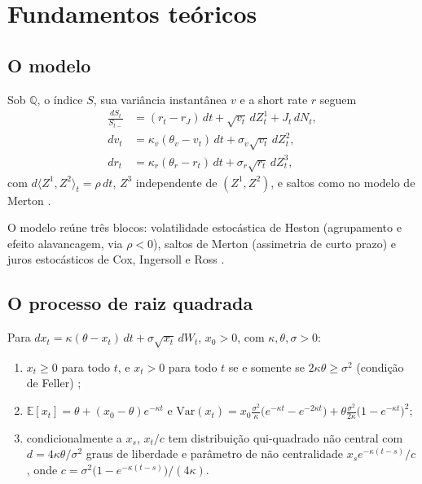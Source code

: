 \section{Fundamentos teóricos}

\subsection{O modelo}

\begin{definicao}
Sob $\mathbb Q$, o índice $S$, sua variância instantânea $v$ e a short rate $r$ seguem
\begin{align}
\frac{dS_t}{S_{t-}}&=(r_t-r_J)\,dt+\sqrt{v_t}\,dZ^1_t+J_t\,dN_t,\\
dv_t&=\kappa_v(\theta_v-v_t)\,dt+\sigma_v\sqrt{v_t}\,dZ^2_t,\label{eq:heston-v}\\
dr_t&=\kappa_r(\theta_r-r_t)\,dt+\sigma_r\sqrt{r_t}\,dZ^3_t,\label{eq:cir}
\end{align}
com $d\langle Z^1,Z^2\rangle_t=\rho\,dt$, $Z^3$ independente de $(Z^1,Z^2)$, e saltos como no modelo de Merton \citep{bcc1997}.
\end{definicao}

O modelo reúne três blocos: volatilidade estocástica de Heston (agrupamento e efeito alavancagem, via $\rho<0$), saltos de Merton (assimetria de curto prazo) e juros estocásticos de Cox, Ingersoll e Ross \citep{cir1985}.

\subsection{O processo de raiz quadrada}

\begin{proposicao}\label{prop:cir}
Para $dx_t=\kappa(\theta-x_t)\,dt+\sigma\sqrt{x_t}\,dW_t$, $x_0>0$, com $\kappa,\theta,\sigma>0$:
\begin{enumerate}
\item $x_t\ge0$ para todo $t$, e $x_t>0$ para todo $t$ se e somente se $2\kappa\theta\ge\sigma^2$ (condição de Feller) \citep{feller1951};
\item $\mathbb E[x_t]=\theta+(x_0-\theta)e^{-\kappa t}$ e $\mathrm{Var}(x_t)=x_0\frac{\sigma^2}{\kappa}\big(e^{-\kappa t}-e^{-2\kappa t}\big)+\theta\frac{\sigma^2}{2\kappa}\big(1-e^{-\kappa t}\big)^2$;
\item condicionalmente a $x_s$, $x_t/c$ tem distribuição qui-quadrado não central com $d=4\kappa\theta/\sigma^2$ graus de liberdade e parâmetro de não centralidade $x_se^{-\kappa(t-s)}/c$, onde $c=\sigma^2\big(1-e^{-\kappa(t-s)}\big)/(4\kappa)$.
\end{enumerate}
\end{proposicao}

